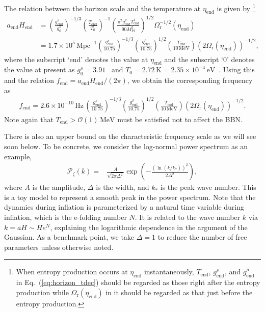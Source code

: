 \documentclass[superscriptaddress, aps, preprintnumbers,
amsmath, amssymb, sort&compress, nofootinbib, 10pt, paper, floatfix]{revtex4-2}
\newcommand{\MeV}{\text{MeV}}
\newcommand{\Pl}{\text{Pl}}
\newcommand{\en}{{\text{end}}}
\newcommand{\Mpc}{{\text{Mpc}}}
\newcommand{\rr}{\text{r}}
\begin{document}
The relation between the horizon scale and the temperature at $\eta_\en$ is given by 
\footnote{
When entropy production occurs at $\eta_\en$ instantaneously, $T_\en$, $g^s_\en$, and $g^\rho_\en$ in Eq.~(\ref{eq:horizon_tdec}) should be regarded as those right after the entropy production while $\Omega_\rr(\eta_\en)$ in it should be regarded as that just before the entropy production.
} 
\begin{align}
  a_\en H_\en &=  \left( \frac{g^s_\en}{g^s_0} \right)^{-1/3} \left(\frac{T_\en}{T_0}\right)^{-1} \left( \frac{\pi^2 g^\rho_\en T^4_\en}{90 M_\Pl^2} \right)^{1/2} \Omega^{-1/2}_\rr(\eta_\en) \nonumber \\
  &= 1.7\times 10^{5}\,\Mpc^{-1} \left( \frac{g^s_\en}{10.75} \right)^{-1/3} \left( \frac{g^\rho_\en}{10.75} \right)^{1/2} \left(\frac{T_\en}{10\, \MeV}\right) (2 \Omega_\rr(\eta_\en))^{-1/2},
  \label{eq:horizon_tdec}
\end{align}
where the subscript `end' denotes the value at $\eta_\en$ and the subscript `$0$' denotes the value at present as $g^s_0 = 3.91$~\cite{Kolb:206230} and $T_0 = 2.72\,\text{K} = 2.35\times 10^{-4}\,\text{eV}$~\cite{Planck:2018vyg}.
Using this and the relation $f_\en= a_\en H_\en/(2\pi)$, we obtain the corresponding frequency as 
\begin{align}
    f_\en = 2.6 \times 10^{-10} \, \mathrm{Hz} \, \left( \frac{g^s_\en}{10.75} \right)^{-1/3}\left( \frac{g^\rho_\en}{10.75} \right)^{1/2}  \left( \frac{T_\en}{10 \, \mathrm{MeV}} \right) (2\Omega_\text{r}(\eta_\en))^{-1/2}.
\end{align}
Note again that $T_\en> \mathcal O(1)\,\MeV$ must be satisfied not to affect the BBN.



There is also an upper bound on the characteristic frequency scale as we will see soon below.  To be concrete, we consider the log-normal power spectrum as an example,
\begin{align}
    \mathcal{P}_\zeta (k) = & \frac{A}{\sqrt{2\pi \Delta^2}} \exp \left( -\frac{(\ln (k/k_*))^2}{2 \Delta^2} \right),
    \label{eq:p_zeta_pro}
\end{align}
where $A$ is the amplitude, $\Delta$ is the width, and $k_*$ is the peak wave number.  This is a toy model to represent a smooth peak in the power spectrum.  Note that the dynamics during inflation is parameterized by a natural time variable during inflation, which is the e-folding number $N$.  It is related to the wave number $k$ via $k = a H \sim H e^{N}$, explaining the logarithmic dependence in the argument of the Gaussian. As a benchmark point, we take $\Delta = 1$ to reduce the number of free parameters unless otherwise noted. 
\end{document}

